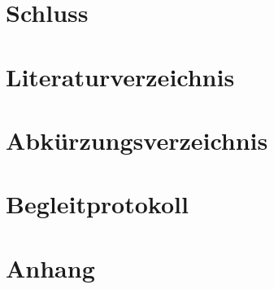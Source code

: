 \chapter{Schluss}
\label{chap:con}

\pagebreak

\chapter{Literaturverzeichnis}
\pagebreak

\listoffigures
\pagebreak

\chapter{Abkürzungsverzeichnis}
\pagebreak

\chapter{Begleitprotokoll}

\chapter{Anhang}\Blindtext[2]
